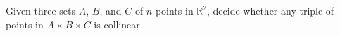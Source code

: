 \begin{problem}
	Given three sets \(A\), \(B\), and \(C\) of
	\(n\) points in \(\mathbb{R}^2\), decide
	whether any triple of points in \(A \times B \times C\) is collinear.
\end{problem}
